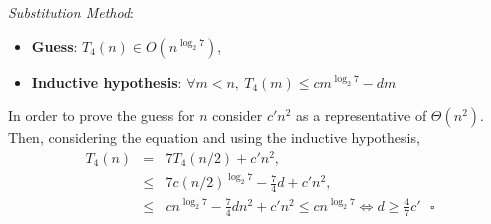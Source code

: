 \documentclass{article}
\begin{document}
	
	\noindent \textit{Substitution Method}:
	\begin{itemize}
		\item \textbf{Guess}: $T_4(n) \in O(n^{\log_2 7})$,  
		\item \textbf{Inductive hypothesis}: $\forall m < n, ~  T_4(m) \leq cm^{\log_2 7} - dm$ 
	\end{itemize} 
	In order to prove the guess for $n$ consider $c'n^2$ as a representative of $\Theta(n^2)$. Then, considering the equation and using the inductive hypothesis,
	\begin{eqnarray}
	\nonumber
	T_4(n) &=& 7 T_4 (n/2) + c'n^2,\\
	\nonumber
	&\leq& 7 c (n/2)^{\log_2 7} - \frac{7}{4}d + c'n^2,\\
	\nonumber
	&\leq& cn^{\log_2 7} - \frac{7}{4} dn^2 + c'n^2 \leq  cn^{\log_2 7}  \Leftrightarrow d \geq \frac{4}{7} c' ~~~ \square
	\nonumber 
	\end{eqnarray} 
\end{document}
